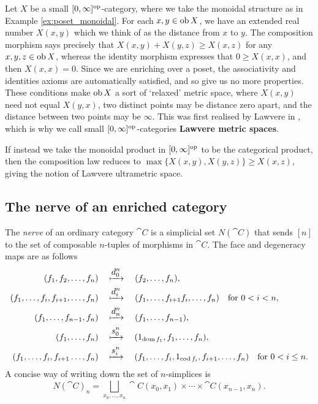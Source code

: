 \begin{example}
    Let $X$ be a small $[0,\infty]^{\mathrm{op}}$-category, where we take the monoidal structure as in Example \ref{ex:poset_monoidal}. For each $x, y \in \operatorname{ob} X$, we have an extended real number $X(x,y)$ which we think of as the distance from $x$ to $y$. The composition morphism says precisely that $X(x,y) + X(y,z) \geq X(x,z)$ for any $x, y, z \in \operatorname{ob} X$, whereas the identity morphism expresses that $0 \geq X(x,x)$, and then $X(x,x) = 0$. Since we are enriching over a poset, the associativity and identities axioms are automatically satisfied, and so give us no more properties. These conditions make $\operatorname{ob} X$ a sort of `relaxed' metric space, where $X(x,y)$ need not equal $X(y,x)$, two distinct points may be distance zero apart, and the distance between two points may be $\infty$. This was first realised by Lawvere in \cite{Lawvere1973}, which is why we call small $[0,\infty]^{\mathrm{op}}$-categories \textbf{Lawvere metric spaces}. 

    If instead we take the monoidal product in $[0,\infty]^{\mathrm{op}}$ to be the categorical product, then the composition law reduces to $\max\{X(x,y), X(y,z)\} \geq X(x,z)$, giving the notion of Lawvere ultrametric space.
\end{example}

\subsection{The nerve of an enriched category}
The \textit{nerve} of an ordinary category $\cat{C}$ is a simplicial set $N(\cat{C})$ that sends $[n]$ to the set of composable $n$-tuples of morphisms in $\cat{C}$. The face and degeneracy maps are as follows
\begin{align*}
    (f_1,f_2,\dots,f_n) \quad &\xmapsto{\displaystyle d_0^n} \quad (f_2,\dots,f_n), \\
    (f_1,\dots,f_i,f_{i+1},\dots,f_n) \quad &\xmapsto{\displaystyle d_i^n} \quad (f_1,\dots,f_{i+1}f_i, \dots, f_n) \quad \text{for } 0 < i < n, \\
    (f_1,\dots,f_{n-1},f_n) \quad &\xmapsto{\displaystyle d_n^n} \quad (f_1,\dots,f_{n-1}), \\
    (f_1,\dots,f_n) \quad & \xmapsto{\displaystyle s_0^n} \quad (1_{\operatorname{dom} f_1}, f_1, \dots, f_n), \\
    (f_1,\dots,f_i,f_{i+1}\dots,f_n) \quad &\xmapsto{\displaystyle s^n_i} \quad (f_1,\dots,f_i, 1_{\operatorname{cod} f_i}, f_{i+1}, \dots, f_n) \quad \text{for } 0 < i \leq n.
\end{align*}
A concise way of writing down the set of $n$-simplices is
\begin{equation}\label{eq:ordinary_nerve}
    N(\cat{C})_n = \bigsqcup_{x_0,\dots,x_n} \cat{C}(x_0,x_1) \times \cdots \times \cat{C}(x_{n-1},x_n).
\end{equation}

